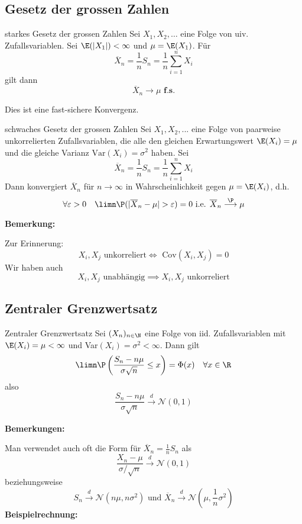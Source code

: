 \subsection{Gesetz der grossen Zahlen}
\begin{mainbox}{starkes Gesetz der grossen Zahlen}
    Sei $X_1, X_2, \ldots$ eine Folge von uiv. Zufallsvariablen. Sei $\E(|X_1|)<\infty$ und $\mu = \E(X_1)$. Für
    $$\overline{X}_n = \frac{1}{n}S_n = \frac{1}{n}\sum_{i = 1}^{n}X_i$$
    gilt dann
    $$\overline{X}_n \longrightarrow \mu \textbf{ f.s.}$$
\end{mainbox}
Dies ist eine fast-sichere Konvergenz.
\begin{mainbox}{schwaches Gesetz der grossen Zahlen}
    Sei $X_1, X_2, ...$ eine Folge von paarweise unkorrelierten Zufallsvariablen, die alle den gleichen Erwartungswert $\E(X_i) = \mu$ und die gleiche Varianz $\text{Var}(X_i) = \sigma^2$ haben.
    Sei 
    $$\overline{X}_n = \frac{1}{n}S_n = \frac{1}{n}\sum_{i = 1}^{n}X_i$$
    Dann konvergiert $\overline{X}_n$ für $n \to \infty$ in Wahrscheinlichkeit gegen $\mu = \E(X_i)$, d.h.
    $$\forall \varepsilon > 0 \quad \limn \P(|\overline{X}_n - \mu| > \varepsilon) = 0 \text{ i.e. } \overline{X}_n \overset{\P}{\longrightarrow} \mu$$
\end{mainbox}
\textbf{Bemerkung: }

Zur Erinnerung: 
$$X_i, X_j \text{ unkorreliert} \iff \text{ Cov}(X_i, X_j) = 0$$
Wir haben auch 
$$X_i, X_j \text{ unabhängig} \implies X_i, X_j \text{ unkorreliert}$$

\subsection{Zentraler Grenzwertsatz}
\begin{mainbox}{Zentraler Grenzwertsatz}
    Sei $(X_n)_{n\in \N}$ eine Folge von iid. Zufallsvariablen mit $\E(X_i) = \mu < \infty$ und Var$(X_i) = \sigma^2 < \infty$.
    Dann gilt 
    $$\limn \P\left(\frac{S_n - n \mu}{\sigma \sqrt{n}} \leq x\right) = \Phi(x) \quad \forall x \in \R$$
    also
    $$\frac{S_n - n \mu}{\sigma \sqrt{n}} \overset{d}{\longrightarrow} \mathcal{N}(0,1)$$
\end{mainbox}
\textbf{Bemerkungen: }

Man verwendet auch oft die Form für $\overline{X}_n = \frac{1}{n}S_n$ als
$$\frac{X_n - \mu}{\sigma / \sqrt{n}} \overset{d}{\longrightarrow} \mathcal{N}(0,1)$$
beziehungsweise
$$S_n \overset{d}{\longrightarrow} \mathcal{N}(n\mu, n \sigma^2) \text{ und } \overline{X}_n \overset{d}{\longrightarrow} \mathcal{N}\left(\mu, \frac{1}{n}\sigma^2\right)$$
\textbf{Beispielrechnung:}

